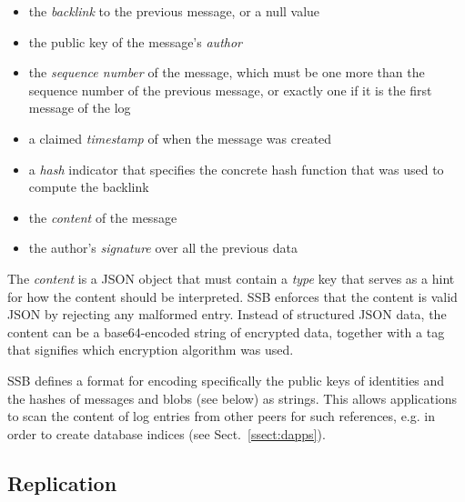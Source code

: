 \documentclass[10pt,sigconf]{acmart}
\begin{document}
\begin{itemize}

\item the {\em backlink} to the previous message, or a null value

\item the public key of the message's {\em author}

\item the {\em sequence number} of the message, which must be one more than the sequence number of the previous message, or exactly one if it is the first message of the log

\item a claimed {\em timestamp} of when the message was created

\item a {\em hash} indicator that specifies the concrete hash function that was used to compute the backlink

\item the {\em content} of the message

\item the author's {\em signature} over all the previous data

\end{itemize}

The {\em content} is a JSON object that must contain a {\em type} key that serves as a hint for how the content should be interpreted. SSB enforces that the content is valid JSON by rejecting any malformed entry.
Instead of structured JSON data, the content can be a base64-encoded string of encrypted data, together with a tag that signifies which encryption algorithm was used.

SSB defines a format for encoding specifically the public keys of identities and the hashes of messages and blobs (see below) as strings. This allows applications to scan the content of log entries from other peers for such references, e.g. in order to create database indices (see Sect.~\ref{ssect:dapps}).


\subsection*{Replication}
\end{document}
